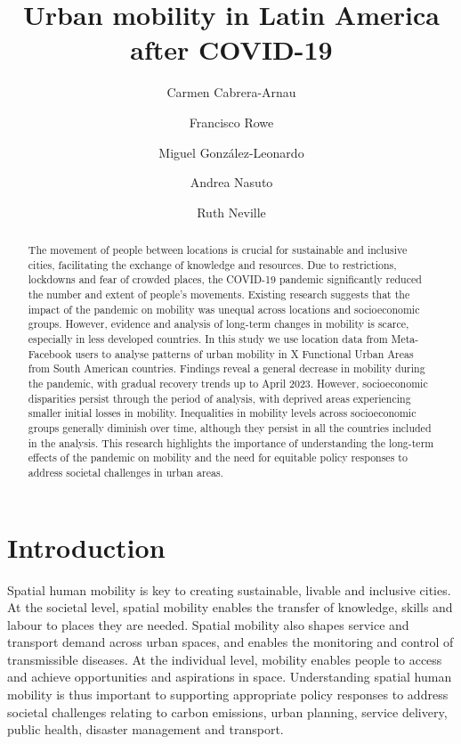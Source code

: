 \documentclass[
  11pt,
]{article}
\title{\textbf{Urban mobility in Latin America after COVID-19}}
\author[1]{Carmen Cabrera-Arnau}
\author[1]{Francisco Rowe}
\author[2]{Miguel González-Leonardo}
\author[1]{Andrea Nasuto}
\author[1]{Ruth Neville}
\affil[1]{Geographic Data Science Lab, Department of Geography and
Planning, University of Liverpool, Liverpool, UK}
\affil[2]{Centre for Demographic Urban and Environmental Studies, El
Colegio de México, Ciudad de México, México}
\date{}
\begin{document}
\maketitle
\begin{abstract}
The movement of people between locations is crucial for sustainable and
inclusive cities, facilitating the exchange of knowledge and resources.
Due to restrictions, lockdowns and fear of crowded places, the COVID-19
pandemic significantly reduced the number and extent of people's
movements. Existing research suggests that the impact of the pandemic on
mobility was unequal across locations and socioeconomic groups. However,
evidence and analysis of long-term changes in mobility is scarce,
especially in less developed countries. In this study we use location
data from Meta-Facebook users to analyse patterns of urban mobility in X
Functional Urban Areas from South American countries. Findings reveal a
general decrease in mobility during the pandemic, with gradual recovery
trends up to April 2023. However, socioeconomic disparities persist
through the period of analysis, with deprived areas experiencing smaller
initial losses in mobility. Inequalities in mobility levels across
socioeconomic groups generally diminish over time, although they persist
in all the countries included in the analysis. This research highlights
the importance of understanding the long-term effects of the pandemic on
mobility and the need for equitable policy responses to address societal
challenges in urban areas.
\end{abstract}
\ifdefined\Shaded\renewenvironment{Shaded}{\begin{tcolorbox}[enhanced, sharp corners, frame hidden, breakable, boxrule=0pt, interior hidden, borderline west={3pt}{0pt}{shadecolor}]}{\end{tcolorbox}}\fi

\hypertarget{sec-intro}{%
\section{Introduction}\label{sec-intro}}

Spatial human mobility is key to creating sustainable, livable and
inclusive cities. At the societal level, spatial mobility enables the
transfer of knowledge, skills and labour to places they are needed.
Spatial mobility also shapes service and transport demand across urban
spaces, and enables the monitoring and control of transmissible
diseases. At the individual level, mobility enables people to access and
achieve opportunities and aspirations in space. Understanding spatial
human mobility is thus important to supporting appropriate policy
responses to address societal challenges relating to carbon emissions,
urban planning, service delivery, public health, disaster management and
transport.
\end{document}
